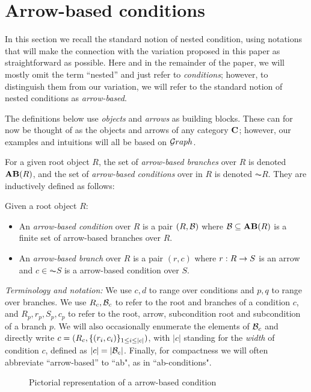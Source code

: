 \section{Arrow-based conditions}
 
In this section we recall the standard notion of nested condition, using notations that will make the connection with the variation proposed in this paper as straightforward as possible. Here and in the remainder of the paper, we will mostly omit the term ``nested'' and just refer to \emph{conditions}; however, to distinguish them from our variation, we will refer to the standard notion of nested conditions as \emph{arrow-based}.

The definitions below use \emph{objects} and \emph{arrows} as building blocks. These can for now be thought of as the objects and arrows of any category $\mathbf{C}$; however, our examples and intuitions will all be based on ${\mathcal Graph}$.

For a given root object $R$, the set of \emph{arrow-based branches} over $R$ is denoted $\AB{R}$, and the set of \emph{arrow-based conditions} over in $R$ is denoted $\AC R$. They are inductively defined as follows:

\begin{definition}
  Given a root object $R$:
  \begin{itemize}
  \item An \emph{arrow-based condition} over $R$ is a pair $(R,\mathcal{B})$ where $\cB\subseteq \AB R$ is a finite set of arrow-based branches over $R$.
  \item An \emph{arrow-based branch} over $R$ is a pair $(r,c)$ where $r: R\rightarrow S$ is an arrow and $c\in \AC S$ is a arrow-based condition over $S$.
  \end{itemize}
\end{definition}
%
\emph{Terminology and notation:} We use $c,d$ to range over conditions and $p,q$ to range over branches. We use $R_c,\mathcal{B}_c$ to refer to the root and branches of a condition $c$, and $R_p,r_p,S_p,c_p$ to refer to the root, arrow, subcondition root and subcondition of a branch $p$. We will also occasionally enumerate the elements of $\mathcal{B}_c$ and directly write $c=(R_c, \{{(r_i, c_i)}\}_{1\leq i\leq |c|})$, with $|c|$ standing for the \emph{width} of condition $c$, defined as $|c|=|\mathcal{B}_c|$. Finally, for compactness we will often abbreviate ``arrow-based'' to ``ab", as in ``ab-conditions".
%
\begin{figure}
  \centering
  
  \caption{Pictorial representation of a arrow-based condition}
\end{figure}

